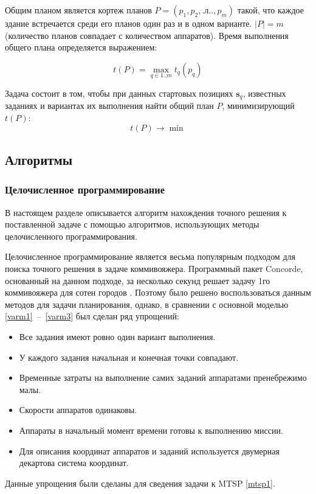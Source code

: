 \documentclass[a4paper,14pt,russian]{article}
\begin{document}
Общим планом является кортеж планов $P = (p_1, p_2, .л.., p_m)$ такой, что каждое здание встречается среди его планов один раз и в одном варианте. $|P| = m$ (количество планов совпадает с количеством аппаратов). Время выполнения общего плана определяется выражением:

\begin{equation} \label{varm2}
t(P) = \displaystyle \max_{q \in 1..m} t_q(p_q)
\end{equation}

Задача состоит в том, чтобы при данных стартовых позициях $\mathbf{s}_q$, известных заданиях и вариантах их выполнения найти общий план $P$, минимизирующий $t(P)$:
\begin{equation} \label{varm3}
t(P) \rightarrow \min
\end{equation}


\subsection{Алгоритмы}
\subsubsection{Целочисленное программирование}

В настоящем разделе описывается алгоритм нахождения точного решения к поставленной задаче с помощью алгоритмов, использующих методы целочисленного программирования.

Целочисленное программирование является весьма популярным подходом для поиска точного решения в задаче коммивояжера.
Программный пакет Concorde, основанный на данном подходе, за несколько секунд решает задачу 1го коммивояжера для сотен городов \cite{applegate1999concorde}.
Поэтому было решено воспользоваться данным методов для задачи планирования, однако, в сравнении с основной моделью \eqref{varm1}~--~\eqref{varm3} был сделан ряд упрощений:

\begin{itemize}
\item Все задания имеют ровно один вариант выполнения.
\item У каждого задания начальная и конечная точки совпадают.
\item Временные затраты на выполнение самих заданий аппаратами пренебрежимо малы.
\item Скорости аппаратов одинаковы.
\item Аппараты в начальный момент времени готовы к выполнению миссии.
\item Для описания координат аппаратов и заданий используется двумерная декартова система координат.
\end{itemize}
Данные упрощения были сделаны для сведения задачи к MTSP \eqref{mtsp1}.
\end{document}
